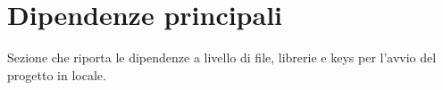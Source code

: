\section{Dipendenze principali}

Sezione che riporta le dipendenze a livello di file, librerie e keys per l'avvio del progetto in locale.
